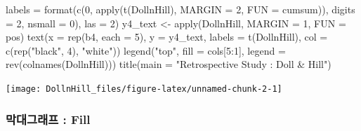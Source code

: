 \documentclass[
]{article}
\newenvironment{Shaded}{\begin{snugshade}}{\end{snugshade}}
\newcommand{\AttributeTok}[1]{\textcolor[rgb]{0.77,0.63,0.00}{#1}}
\newcommand{\DecValTok}[1]{\textcolor[rgb]{0.00,0.00,0.81}{#1}}
\newcommand{\FunctionTok}[1]{\textcolor[rgb]{0.00,0.00,0.00}{#1}}
\newcommand{\NormalTok}[1]{#1}
\newcommand{\OtherTok}[1]{\textcolor[rgb]{0.56,0.35,0.01}{#1}}
\newcommand{\SpecialCharTok}[1]{\textcolor[rgb]{0.00,0.00,0.00}{#1}}
\newcommand{\StringTok}[1]{\textcolor[rgb]{0.31,0.60,0.02}{#1}}
\begin{document}
\begin{Shaded}
\begin{Highlighting}[]
     \AttributeTok{labels =} \FunctionTok{format}\NormalTok{(}\FunctionTok{c}\NormalTok{(}\DecValTok{0}\NormalTok{, }\FunctionTok{apply}\NormalTok{(}\FunctionTok{t}\NormalTok{(DollnHill), }
                                \AttributeTok{MARGIN =} \DecValTok{2}\NormalTok{, }
                                \AttributeTok{FUN =}\NormalTok{ cumsum)), }
                     \AttributeTok{digits =} \DecValTok{2}\NormalTok{, }
                     \AttributeTok{nsmall =} \DecValTok{0}\NormalTok{), }
     \AttributeTok{las =} \DecValTok{2}\NormalTok{)}
\NormalTok{y4\_text }\OtherTok{\textless{}{-}} \FunctionTok{apply}\NormalTok{(DollnHill, }
                 \AttributeTok{MARGIN =} \DecValTok{1}\NormalTok{, }
                 \AttributeTok{FUN =}\NormalTok{ pos)}
\FunctionTok{text}\NormalTok{(}\AttributeTok{x =} \FunctionTok{rep}\NormalTok{(b4, }\AttributeTok{each =} \DecValTok{5}\NormalTok{), }
     \AttributeTok{y =}\NormalTok{ y4\_text, }
     \AttributeTok{labels =} \FunctionTok{t}\NormalTok{(DollnHill), }
     \AttributeTok{col =} \FunctionTok{c}\NormalTok{(}\FunctionTok{rep}\NormalTok{(}\StringTok{"black"}\NormalTok{, }\DecValTok{4}\NormalTok{), }\StringTok{"white"}\NormalTok{))}
\FunctionTok{legend}\NormalTok{(}\StringTok{"top"}\NormalTok{, }
       \AttributeTok{fill =}\NormalTok{ cols[}\DecValTok{5}\SpecialCharTok{:}\DecValTok{1}\NormalTok{], }
       \AttributeTok{legend =} \FunctionTok{rev}\NormalTok{(}\FunctionTok{colnames}\NormalTok{(DollnHill)))}
\FunctionTok{title}\NormalTok{(}\AttributeTok{main =} \StringTok{"Retrospective Study : Doll \& Hill"}\NormalTok{)}
\end{Highlighting}
\end{Shaded}

\begin{center}\texttt{[image: DollnHill\_files/figure-latex/unnamed-chunk-2-1]} \end{center}

\hypertarget{uxb9c9uxb300uxadf8uxb798uxd504-fill}{%
\subsubsection{막대그래프 :
Fill}\label{uxb9c9uxb300uxadf8uxb798uxd504-fill}}
\end{document}
